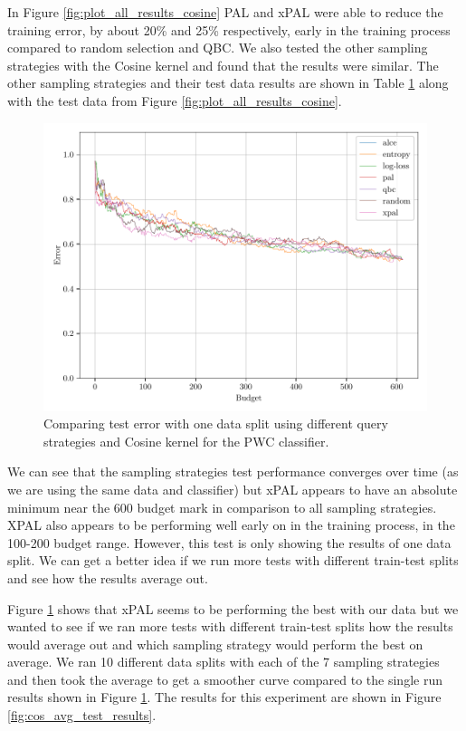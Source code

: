 In Figure \ref{fig:plot_all_results_cosine} PAL and xPAL were able to reduce the training error, by about 20\% and 25\% respectively, early in the training process compared to random selection and QBC. We also tested the other sampling strategies with the Cosine kernel and found that the results were similar. The other sampling strategies and their test data results are shown in Table \ref{fig:cos_test_results} along with the test data from Figure \ref{fig:plot_all_results_cosine}. 


\begin{figure}[ht]
    \centering
    \includegraphics[width=\textwidth]{../img/plot_kernel_cos_test_results.pdf}
    \caption{Comparing test error with one data split using different query strategies and Cosine kernel for the PWC classifier.}
    \label{fig:cos_test_results}
\end{figure}

We can see that the sampling strategies test performance converges over time (as we are using the same data and classifier) but xPAL appears to have an absolute minimum near the 600 budget mark in comparison to all sampling strategies. XPAL also appears to be performing well early on in the training process, in the 100-200 budget range. However, this test is only showing the results of one data split. We can get a better idea if we run more tests with different train-test splits and see how the results average out.

Figure \ref{fig:cos_test_results} shows that xPAL seems to be performing the best with our data but we wanted to see if we ran more tests with different train-test splits how the results would average out and which sampling strategy would perform the best on average. We ran 10 different data splits with each of the 7 sampling strategies and then took the average to get a smoother curve compared to the single run results shown in Figure \ref*{fig:cos_test_results}. The results for this experiment are shown in Figure \ref{fig:cos_avg_test_results}. 

